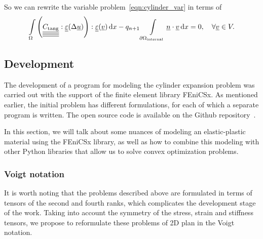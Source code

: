\documentclass[12pt]{article}
\begin{document}
So we can rewrite the variable problem~\ref{eqn:cylinder_var} in terms of 
\begin{equation}
    \int\limits_\Omega \left( \underline{\underline{\underline{\underline{C_{\text{tang}}}}}} : \underline{\underline{\varepsilon}}(\Delta\underline{u}) \right) : \underline{\underline{\varepsilon}}(\underline{v}) \, \mathrm{d} x - q_{n+1}\int\limits_{\partial\Omega_\text{internal}}\underline{n} \cdot \underline{v} \, \mathrm{d} x = 0, \quad \forall \underline{v} \in V.
\end{equation}

\subsection{Development}

The development of a program for modeling the cylinder expansion problem was carried out with the support of the finite element library FEniCSx. As mentioned earlier, the initial problem has different formulations, for each of which a separate program is written. The open source code is available on the Github repository~\cite{convex-plasticity}. 

In this section, we will talk about some nuances of modeling an elastic-plastic material using the FEniCSx library, as well as how to combine this modeling with other Python libraries that allow us to solve convex optimization problems.

\subsubsection{Voigt notation}

It is worth noting that the problems described above are formulated in terms of tensors of the second and fourth ranks, which complicates the development stage of the work. Taking into account the symmetry of the stress, strain and stiffness tensors, we propose to reformulate these problems of 2D plan in the Voigt notation.
\end{document}
